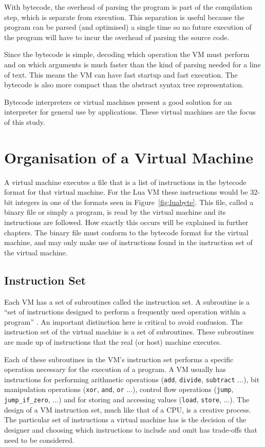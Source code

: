 \documentclass[english,a4paper,12pt]{report}
\begin{document}
With bytecode, the overhead of parsing the program is part of the
compilation step, which is separate from execution. This separation is
useful because the program can be parsed (and optimised) a single time
so no future execution of the program will have to incur the overhead
of parsing the source code.

Since the bytecode is simple, decoding which operation the VM must
perform and on which arguments is much faster than the kind of parsing
needed for a line of text. This means the VM can have fast startup and
fast execution. The bytecode is also more compact than the abstract
syntax tree representation.

Bytecode interpreters or virtual machines present a good solution for
an interpreter for general use by applications. These virtual machines
are the focus of this study.

\section{Organisation of a Virtual Machine} 
A virtual machine executes a file that is a list of instructions in
the bytecode format for that virtual machine. For the Lua VM these
instructions would be 32-bit integers in one of the formats seen in
Figure~\ref{fig:luabyte}. This file, called a binary file or simply a
program, is read by the virtual machine and its instructions are
followed. How exactly this occurs will be explained in further
chapters. The binary file must conform to the bytecode format for the
virtual machine, and may only make use of instructions found in the
instruction set of the virtual machine.

\subsection{Instruction Set}
Each VM has a set of subroutines called the instruction set. A
subroutine is a ``set of instructions designed to perform a frequently
used operation within a program'' \cite{ComputerWords}. An important
distinction here is critical to avoid confusion. The instruction set
of the virtual machine is a set of subroutines. These subroutines are
made up of instructions that the real (or host) machine executes.

Each of these subroutines in the VM's instruction set performs a
specific operation necessary for the execution of a program. A VM
usually has instructions for performing arithmetic operations
(\verb|add|, \verb|divide|, \verb|subtract| ...), bit manipulation
operations (\verb|xor|, \verb|and|, \verb|or| ...), control flow
operations (\verb|jump|, \verb|jump_if_zero|, ...) and for storing and
accessing values (\verb|load|, \verb|store|, ...). The design of a VM
instruction set, much like that of a CPU, is a creative process. The
particular set of instructions a virtual machine has is the decision
of the designer and choosing which instructions to include and omit
has trade-offs that need to be considered.
\end{document}
